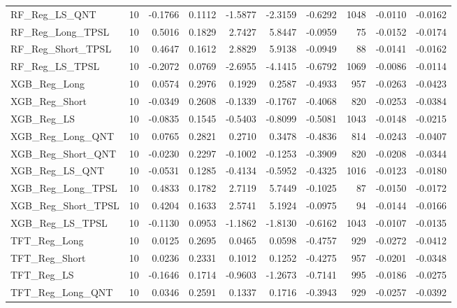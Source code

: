 \begin{tabular}{llrrrrrrrr}
\cline{1-10}
RF\_Reg\_LS\_QNT & 10 & -0.1766 & 0.1112 & -1.5877 & -2.3159 & -0.6292 & 1048 & -0.0110 & -0.0162 \\
\cline{1-10}
RF\_Reg\_Long\_TPSL & 10 & 0.5016 & 0.1829 & 2.7427 & 5.8447 & -0.0959 & 75 & -0.0152 & -0.0174 \\
\cline{1-10}
RF\_Reg\_Short\_TPSL & 10 & 0.4647 & 0.1612 & 2.8829 & 5.9138 & -0.0949 & 88 & -0.0141 & -0.0162 \\
\cline{1-10}
RF\_Reg\_LS\_TPSL & 10 & -0.2072 & 0.0769 & -2.6955 & -4.1415 & -0.6792 & 1069 & -0.0086 & -0.0114 \\
\cline{1-10}
XGB\_Reg\_Long & 10 & 0.0574 & 0.2976 & 0.1929 & 0.2587 & -0.4933 & 957 & -0.0263 & -0.0423 \\
\cline{1-10}
XGB\_Reg\_Short & 10 & -0.0349 & 0.2608 & -0.1339 & -0.1767 & -0.4068 & 820 & -0.0253 & -0.0384 \\
\cline{1-10}
XGB\_Reg\_LS & 10 & -0.0835 & 0.1545 & -0.5403 & -0.8099 & -0.5081 & 1043 & -0.0148 & -0.0215 \\
\cline{1-10}
XGB\_Reg\_Long\_QNT & 10 & 0.0765 & 0.2821 & 0.2710 & 0.3478 & -0.4836 & 814 & -0.0243 & -0.0407 \\
\cline{1-10}
XGB\_Reg\_Short\_QNT & 10 & -0.0230 & 0.2297 & -0.1002 & -0.1253 & -0.3909 & 820 & -0.0208 & -0.0344 \\
\cline{1-10}
XGB\_Reg\_LS\_QNT & 10 & -0.0531 & 0.1285 & -0.4134 & -0.5952 & -0.4325 & 1016 & -0.0123 & -0.0180 \\
\cline{1-10}
XGB\_Reg\_Long\_TPSL & 10 & 0.4833 & 0.1782 & 2.7119 & 5.7449 & -0.1025 & 87 & -0.0150 & -0.0172 \\
\cline{1-10}
XGB\_Reg\_Short\_TPSL & 10 & 0.4204 & 0.1633 & 2.5741 & 5.1924 & -0.0975 & 94 & -0.0144 & -0.0166 \\
\cline{1-10}
XGB\_Reg\_LS\_TPSL & 10 & -0.1130 & 0.0953 & -1.1862 & -1.8130 & -0.6162 & 1043 & -0.0107 & -0.0135 \\
\cline{1-10}
TFT\_Reg\_Long & 10 & 0.0125 & 0.2695 & 0.0465 & 0.0598 & -0.4757 & 929 & -0.0272 & -0.0412 \\
\cline{1-10}
TFT\_Reg\_Short & 10 & 0.0236 & 0.2331 & 0.1012 & 0.1252 & -0.4275 & 957 & -0.0201 & -0.0348 \\
\cline{1-10}
TFT\_Reg\_LS & 10 & -0.1646 & 0.1714 & -0.9603 & -1.2673 & -0.7141 & 995 & -0.0186 & -0.0275 \\
\cline{1-10}
TFT\_Reg\_Long\_QNT & 10 & 0.0346 & 0.2591 & 0.1337 & 0.1716 & -0.3943 & 929 & -0.0257 & -0.0392 \\
\cline{1-10}

\end{tabular}
